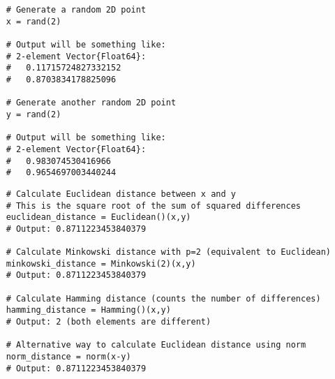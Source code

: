\documentclass[12pt]{article}
\begin{document}
\begin{tcolorbox}[width=\textwidth, left=-6mm, sharp corners, boxrule=0pt, title=\textbf{Create two random 2D points}]
  \begin{verbatim}
    # Generate a random 2D point
    x = rand(2) 
    
    # Output will be something like:
    # 2-element Vector{Float64}:
    #   0.11715724827332152
    #   0.8703834178825096
    
    # Generate another random 2D point
    y = rand(2)
    
    # Output will be something like:
    # 2-element Vector{Float64}:
    #   0.983074530416966
    #   0.9654697003440244
  \end{verbatim}
\end{tcolorbox}

\begin{tcolorbox}[width=\textwidth, left=-6mm, sharp corners, boxrule=0pt, title=\textbf{Calculate different distance metrics}]
  \begin{verbatim}
    # Calculate Euclidean distance between x and y
    # This is the square root of the sum of squared differences
    euclidean_distance = Euclidean()(x,y)
    # Output: 0.8711223453840379
    
    # Calculate Minkowski distance with p=2 (equivalent to Euclidean)
    minkowski_distance = Minkowski(2)(x,y)
    # Output: 0.8711223453840379
    
    # Calculate Hamming distance (counts the number of differences)
    hamming_distance = Hamming()(x,y)
    # Output: 2 (both elements are different)
    
    # Alternative way to calculate Euclidean distance using norm
    norm_distance = norm(x-y)
    # Output: 0.8711223453840379
  \end{verbatim}
\end{tcolorbox}
\end{document}
